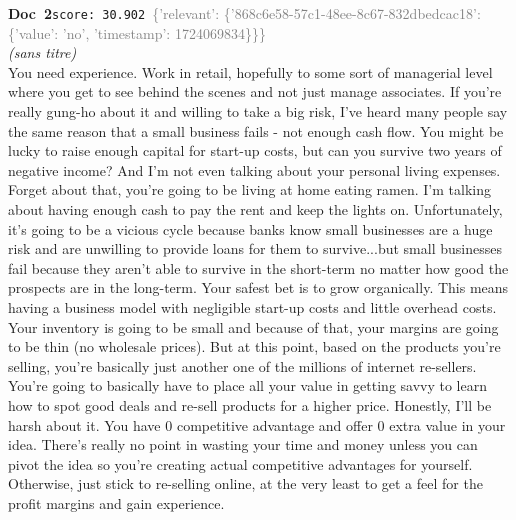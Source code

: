 \documentclass[a4paper,11pt]{article}
\begin{document}
\begin{docenv}
{\footnotesize\textcolor{doccolor}{\textbf{Doc~2}}}\hfill{\tiny\texttt{score:~30.902}}\ {\tiny\textcolor{gray}{\{'relevant': \{'868c6e58-57c1-48ee-8c67-832dbedcac18': \{'value': 'no', 'timestamp': 1724069834\}\}\}}}\\[3pt]
{\small\textit{(sans titre)}}\\[2pt]
\vspace{2pt}
{\footnotesize 
You need experience. Work in retail, hopefully to some sort of managerial level where you get to see behind the scenes and not just manage associates.  If you're really gung-ho about it and willing to take a big risk, I've heard many people say the same reason that a small business fails - not enough cash flow. You might be lucky to raise enough capital for start-up costs, but can you survive two years of negative income? And I'm not even talking about your personal living expenses. Forget about that, you're going to be living at home eating ramen. I'm talking about having enough cash to pay the rent and keep the lights on. Unfortunately, it's going to be a vicious cycle because banks know small businesses are a huge risk and are unwilling to provide loans for them to survive...but small businesses fail because they aren't able to survive in the short-term no matter how good the prospects are in the long-term.   Your safest bet is to grow organically. This means having a business model with negligible start-up costs and little overhead costs. Your inventory is going to be small and because of that, your margins are going to be thin (no wholesale prices). But at this point, based on the products you're selling, you're basically just another one of the millions of internet re-sellers. You're going to basically have to place all your value in getting savvy to learn how to spot good deals and re-sell products for a higher price.   Honestly, I'll be harsh about it. You have 0 competitive advantage and offer 0 extra value in your idea. There's really no point in wasting your time and money unless you can pivot the idea so you're creating actual competitive advantages for yourself. Otherwise, just stick to re-selling online, at the very least to get a feel for the profit margins and gain experience.}
\end{docenv}
\end{document}
